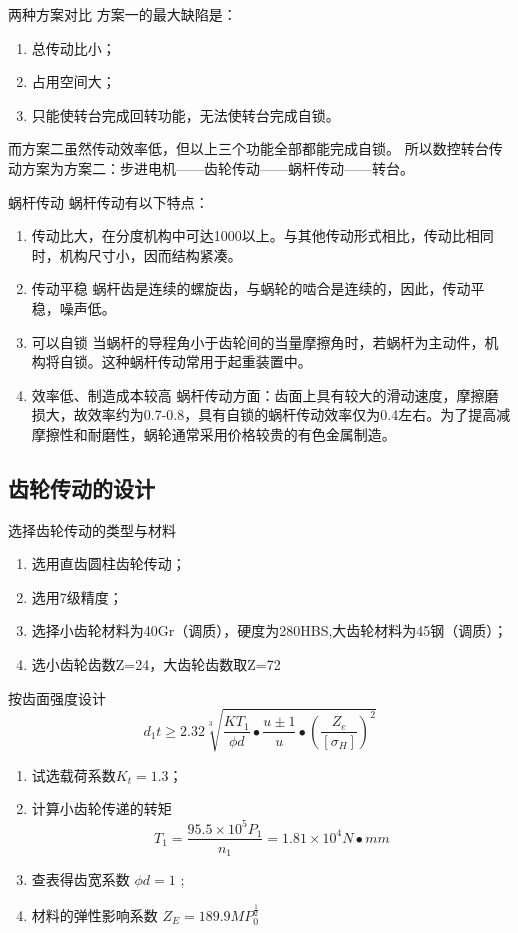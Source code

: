 \documentclass[12pt,xcolor={rgb}]{beamer}
\begin{document}
\begin{frame}{两种方案对比}
方案一的最大缺陷是：
\begin{enumerate}
	\item 总传动比小；
	\item 占用空间大；
	\item 只能使转台完成回转功能，无法使转台完成自锁。
\end{enumerate}
而方案二虽然传动效率低，但以上三个功能全部都能完成自锁。
所以数控转台传动方案为方案二：步进电机——齿轮传动——蜗杆传动——转台。
\end{frame}

\begin{frame}{蜗杆传动}
蜗杆传动有以下特点：
\begin{enumerate}
	\item 传动比大，在分度机构中可达1000以上。与其他传动形式相比，传动比相同时，机构尺寸小，因而结构紧凑。
	\item 传动平稳 蜗杆齿是连续的螺旋齿，与蜗轮的啮合是连续的，因此，传动平稳，噪声低。
	\item 可以自锁 当蜗杆的导程角小于齿轮间的当量摩擦角时，若蜗杆为主动件，机构将自锁。这种蜗杆传动常用于起重装置中。
	\item 效率低、制造成本较高  蜗杆传动方面：齿面上具有较大的滑动速度，摩擦磨损大，故效率约为0.7-0.8，具有自锁的蜗杆传动效率仅为0.4左右。为了提高减摩擦性和耐磨性，蜗轮通常采用价格较贵的有色金属制造。
\end{enumerate}
\end{frame}

\subsection{齿轮传动的设计}

\begin{frame}{选择齿轮传动的类型与材料}
\begin{enumerate}
	\item 选用直齿圆柱齿轮传动；
	\item 选用7级精度；
	\item 选择小齿轮材料为40Gr（调质），硬度为280HBS,大齿轮材料为45钢（调质）；
	\item 选小齿轮齿数Z=24，大齿轮齿数取Z=72
\end{enumerate}
\end{frame}

\begin{frame}{按齿面强度设计}
$$  d_1t \geq 2.32\sqrt[3]{\frac{KT_1}{\phi d} \bullet \frac{u\pm 1}{u} \bullet \left( \frac{Z_e}{[\sigma _H]}   \right)^2} $$
\begin{enumerate}[]
	\item 试选载荷系数$K_t=1.3$；
	\item 计算小齿轮传递的转矩  $$ T_1=\frac{95.5\times 10^5 P_1}{n_1}=1.81\times 10^4 N\bullet mm$$
	\item 查表得齿宽系数 $ \phi d=1$ ;
	\item 材料的弹性影响系数 $Z_E=189.9 MP_0^{\frac{1}{2}}$

\end{enumerate}
\end{frame}
\end{document}
